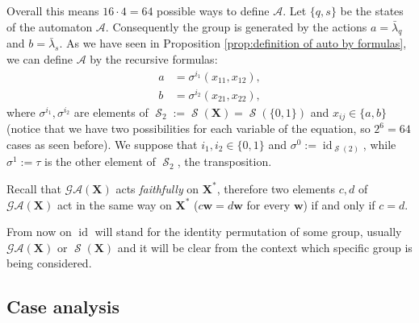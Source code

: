 \documentclass[mat1]{fmfdeloTS2.0}
\newcommand{\word}{\mathbf}				%
\newcommand{\abece}{\mathbf{X}}			%
\newcommand{\fslovar}{\mathbf{X^*}}		%
\newcommand{\auto}{\mathcal}			%
\newcommand{\synaut}{\mathcal{GA}}	%
\newcommand{\LAMBDA}{\bar{\lambda}}			%
\DeclareMathOperator{\symm}{\mathcal{S}}		%
\DeclareMathOperator{\id}{\mathrm{id}}			%
\begin{document}
Overall this means $16\cdot4 = 64$ possible ways to define $\auto{A}$. Let $\{q,s\}$ be the states of the automaton $\auto{A}$. Consequently the group is generated by the actions $a=\LAMBDA_q$ and $b=\LAMBDA_s$. As we have seen in Proposition \autoref{prop:definition of auto by formulas}, we can define $\auto{A}$ by the recursive formulas:
\begin{equation}
\begin{split}
a&=\sigma^{i_1}(x_{11},x_{12}),\\
b&=\sigma^{i_2}(x_{21},x_{22}),
\end{split}
\end{equation}\label{eq: recursive definition}
where $\sigma^{i_1},\sigma^{i_2}$ are elements of $\symm_2:=\symm(\abece)=\symm(\{0,1\})$ and $x_{ij}\in\{a,b\}$ (notice that we have two possibilities for each variable of the equation, so $2^6=64$ cases as seen before). We suppose that $i_1,i_2\in\{0,1\}$ and $\sigma^{0}:=\id_{\symm(2)}$, while $\sigma^1:=\tau$ is the other element of $\symm_2$, the transposition.

\begin{remark}
Recall that $\synaut(\abece)$ acts \emph{faithfully} on $\fslovar$, therefore two elements $c,d$ of $\synaut(\abece)$ act in the same way on $\fslovar$ ($c\word{w}=d\word{w}$ for every $\word{w}$) if and only if $c=d$.
\label{obs: same act=same element}
\end{remark}

\begin{remark}
From now on $\id$ will stand for the identity permutation of some group, usually $\synaut(\abece)$ or $\symm(\abece)$ and it will be clear from the context which specific group is being considered.
\end{remark}

\subsection{Case analysis}
\end{document}

